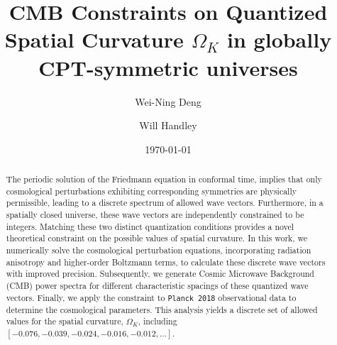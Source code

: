 \documentclass[%
 reprint,
 amsmath,amssymb,
 prd, %
]{revtex4-2}
\begin{document}

\title{CMB Constraints on Quantized Spatial Curvature $\Omega_K$ in globally CPT-symmetric universes}%

\author{Wei-Ning Deng}
 

\author{Will Handley}%


\date{\today}%

\begin{abstract}
The periodic solution of the Friedmann equation in conformal time, implies that only cosmological perturbations exhibiting corresponding symmetries are physically permissible, leading to a discrete spectrum of allowed wave vectors. %
Furthermore, in a spatially closed universe, these wave vectors are independently constrained to be integers. %
Matching these two distinct quantization conditions provides a novel theoretical constraint on the possible values of spatial curvature. %
In this work, we numerically solve the cosmological perturbation equations, incorporating radiation anisotropy and higher-order Boltzmann terms, to calculate these discrete wave vectors with improved precision. %
Subsequently, we generate Cosmic Microwave Background (CMB) power spectra for different characteristic spacings of these quantized wave vectors. %
Finally, we apply the constraint to \texttt{Planck 2018} observational data to determine the cosmological parameters. This analysis yields a discrete set of allowed values for the spatial curvature, $\Omega_K$, including $[-0.076,-0.039, -0.024, -0.016, -0.012, \dots]$. %
\end{abstract}
\end{document}
